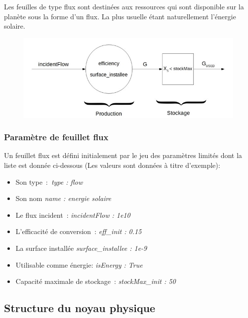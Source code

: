 \documentclass[12pt,a4paper]{article}%
\begin{document}
Les feuilles de type flux sont destinées aux ressources qui sont disponible
sur la planète sous la forme d'un flux. La plus usuelle étant
naturellement l'énergie solaire.

\begin{figure}[h]
\centering
\includegraphics[width=1.0\textwidth]{figures/FeuilleFlux.jpg}\end{figure}

\subsubsection{Paramètre de feuillet flux}

Un feuillet flux est défini initialement par le jeu des paramètres limités
dont la liste est donnée ci-dessous (Les valeurs sont données à titre d'exemple):

\begin{itemize}
\item Son type~:\textit{\ type : flow}

\item Son nom \textit{name : energie solaire}

\item Le flux incident~: \textit{incidentFlow : 1e10}

\item L'efficacité de conversion~: \textit{eff\_init : 0.15}

\item La surface installée \textit{surface\_installee : 1e-9}

\item Utilisable comme énergie: \textit{isEnergy : True }

\item Capacité maximale de stockage~: \textit{stockMax\_init : 50}
\end{itemize}

\subsection{Structure du noyau physique}
\end{document}
